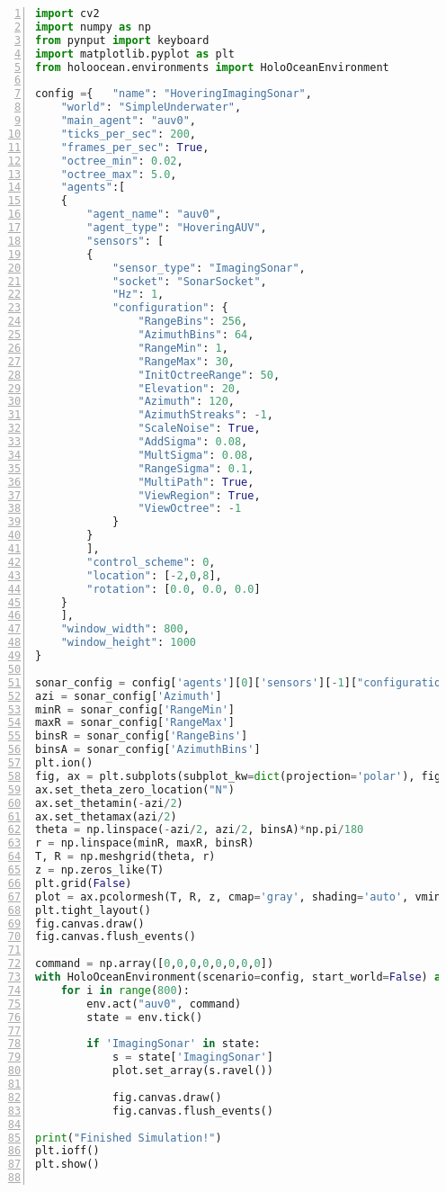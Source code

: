 \documentclass[]{article}
\begin{document}
\begin{lstlisting}[frame=single, numbers=left, language=Python]
import cv2
import numpy as np
from pynput import keyboard
import matplotlib.pyplot as plt
from holoocean.environments import HoloOceanEnvironment

config ={   "name": "HoveringImagingSonar",
	"world": "SimpleUnderwater",
	"main_agent": "auv0",
	"ticks_per_sec": 200,
	"frames_per_sec": True,
	"octree_min": 0.02,
	"octree_max": 5.0,
	"agents":[
	{
		"agent_name": "auv0",
		"agent_type": "HoveringAUV",
		"sensors": [
		{
			"sensor_type": "ImagingSonar",
			"socket": "SonarSocket",
			"Hz": 1,
			"configuration": {
				"RangeBins": 256,
				"AzimuthBins": 64,
				"RangeMin": 1,
				"RangeMax": 30,
				"InitOctreeRange": 50,
				"Elevation": 20,
				"Azimuth": 120,
				"AzimuthStreaks": -1,
				"ScaleNoise": True,
				"AddSigma": 0.08,
				"MultSigma": 0.08,
				"RangeSigma": 0.1,
				"MultiPath": True,
				"ViewRegion": True,
				"ViewOctree": -1
			}
		}
		],
		"control_scheme": 0,
		"location": [-2,0,8],
		"rotation": [0.0, 0.0, 0.0]
	}
	],
	"window_width": 800,
	"window_height": 1000    
}

sonar_config = config['agents'][0]['sensors'][-1]["configuration"]
azi = sonar_config['Azimuth']
minR = sonar_config['RangeMin']
maxR = sonar_config['RangeMax']
binsR = sonar_config['RangeBins']
binsA = sonar_config['AzimuthBins']
plt.ion()
fig, ax = plt.subplots(subplot_kw=dict(projection='polar'), figsize=(8,5))
ax.set_theta_zero_location("N")
ax.set_thetamin(-azi/2)
ax.set_thetamax(azi/2)
theta = np.linspace(-azi/2, azi/2, binsA)*np.pi/180
r = np.linspace(minR, maxR, binsR)  
T, R = np.meshgrid(theta, r)
z = np.zeros_like(T)
plt.grid(False)
plot = ax.pcolormesh(T, R, z, cmap='gray', shading='auto', vmin=0, vmax=1)
plt.tight_layout()
fig.canvas.draw()
fig.canvas.flush_events()

command = np.array([0,0,0,0,0,0,0,0])
with HoloOceanEnvironment(scenario=config, start_world=False) as env:
	for i in range(800):
		env.act("auv0", command)
		state = env.tick()

		if 'ImagingSonar' in state:
			s = state['ImagingSonar']
			plot.set_array(s.ravel())

			fig.canvas.draw()
			fig.canvas.flush_events()

print("Finished Simulation!")
plt.ioff()
plt.show()
	
\end{lstlisting}
\end{document}
